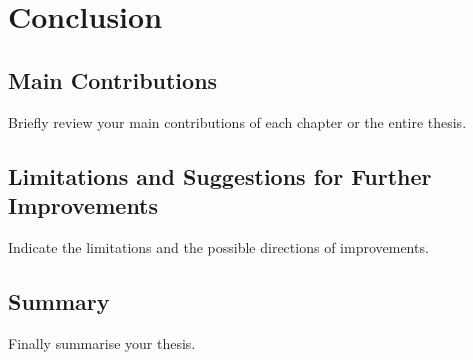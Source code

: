 \chapter{Conclusion}
\label{chap:conclusion}


\section{Main Contributions}
\label{sec:chap7_mainContribut}
Briefly review your main contributions of each chapter or the entire thesis.

\section{Limitations and Suggestions for Further Improvements}
Indicate the limitations and the possible directions of improvements.


\section{Summary}
Finally summarise your thesis. 




















